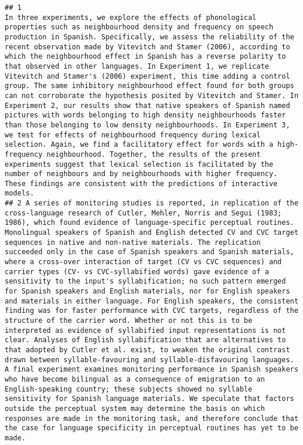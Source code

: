 \documentclass[
  english,
  man]{apa6}
\begin{document}
\begin{verbatim}
## 1                                                                                                                                                                                                                                                                                                                                                                                                                               In three experiments, we explore the effects of phonological properties such as neighbourhood density and frequency on speech production in Spanish. Specifically, we assess the reliability of the recent observation made by Vitevitch and Stamer (2006), according to which the neighbourhood effect in Spanish has a reverse polarity to that observed in other languages. In Experiment 1, we replicate Vitevitch and Stamer's (2006) experiment, this time adding a control group. The same inhibitory neighbourhood effect found for both groups can not corroborate the hypothesis posited by Vitevitch and Stamer. In Experiment 2, our results show that native speakers of Spanish named pictures with words belonging to high density neighbourhoods faster than those belonging to low density neighbourhoods. In Experiment 3, we test for effects of neighbourhood frequency during lexical selection. Again, we find a facilitatory effect for words with a high-frequency neighbourhood. Together, the results of the present experiments suggest that lexical selection is facilitated by the number of neighbours and by neighbourhoods with higher frequency. These findings are consistent with the predictions of interactive models.
## 2 A series of monitoring studies is reported, in replication of the cross-language research of Cutler, Mehler, Norris and Segui (1983; 1986), which found evidence of language-specific perceptual routines. Monolingual speakers of Spanish and English detected CV and CVC target sequences in native and non-native materials. The replication succeeded only in the case of Spanish speakers and Spanish materials, where a cross-over interaction of target (CV vs CVC sequences) and carrier types (CV- vs CVC-syllabified words) gave evidence of a sensitivity to the input's syllabification; no such pattern emerged for Spanish speakers and English materials, nor for English speakers and materials in either language. For English speakers, the consistent finding was for faster performance with CVC targets, regardless of the structure of the carrier word. Whether or not this is to be interpreted as evidence of syllabified input representations is not clear. Analyses of English syllabification that are alternatives to that adopted by Cutler et al. exist, to weaken the original contrast drawn between syllable-favouring and syllable-disfavouring languages. A final experiment examines monitoring performance in Spanish speakers who have become bilingual as a consequence of emigration to an English-speaking country; these subjects showed no syllable sensitivity for Spanish language materials. We speculate that factors outside the perceptual system may determine the basis on which responses are made in the monitoring task, and therefore conclude that the case for language specificity in perceptual routines has yet to be made.

\end{verbatim}
\end{document}
